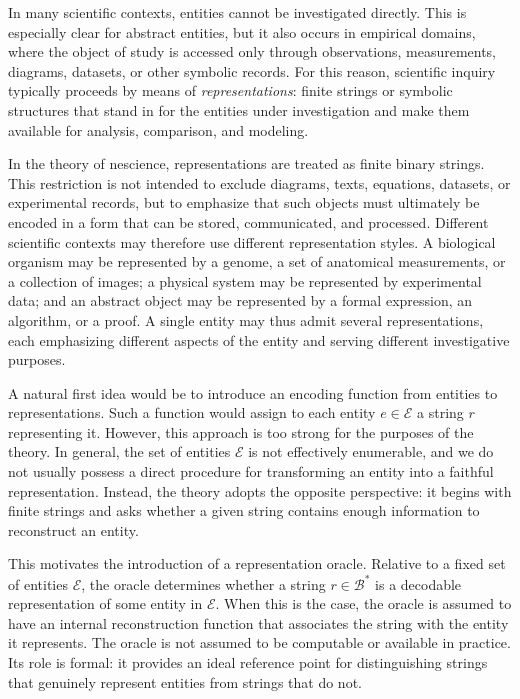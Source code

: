 In many scientific contexts, entities cannot be investigated directly. This is especially clear for abstract entities, but it also occurs in empirical domains, where the object of study is accessed only through observations, measurements, diagrams, datasets, or other symbolic records. For this reason, scientific inquiry typically proceeds by means of \emph{representations}: finite strings or symbolic structures that stand in for the entities under investigation and make them available for analysis, comparison, and modeling.

In the theory of nescience, representations are treated as finite binary strings. This restriction is not intended to exclude diagrams, texts, equations, datasets, or experimental records, but to emphasize that such objects must ultimately be encoded in a form that can be stored, communicated, and processed. Different scientific contexts may therefore use different representation styles. A biological organism may be represented by a genome, a set of anatomical measurements, or a collection of images; a physical system may be represented by experimental data; and an abstract object may be represented by a formal expression, an algorithm, or a proof. A single entity may thus admit several representations, each emphasizing different aspects of the entity and serving different investigative purposes.

A natural first idea would be to introduce an encoding function from entities to representations. Such a function would assign to each entity $e \in \mathcal{E}$ a string $r$ representing it. However, this approach is too strong for the purposes of the theory. In general, the set of entities $\mathcal{E}$ is not effectively enumerable, and we do not usually possess a direct procedure for transforming an entity into a faithful representation. Instead, the theory adopts the opposite perspective: it begins with finite strings and asks whether a given string contains enough information to reconstruct an entity.

This motivates the introduction of a representation oracle. Relative to a fixed set of entities $\mathcal{E}$, the oracle determines whether a string $r \in \mathcal{B}^{\ast}$ is a decodable representation of some entity in $\mathcal{E}$. When this is the case, the oracle is assumed to have an internal reconstruction function that associates the string with the entity it represents. The oracle is not assumed to be computable or available in practice. Its role is formal: it provides an ideal reference point for distinguishing strings that genuinely represent entities from strings that do not.

